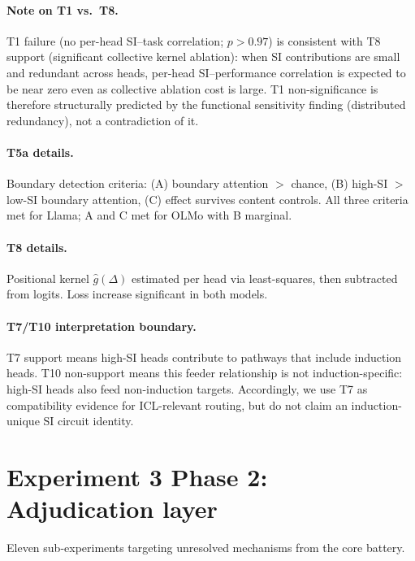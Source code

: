 \documentclass{article}
\begin{document}
\paragraph{Note on T1 vs.\ T8.}
T1 failure (no per-head SI--task correlation; $p > 0.97$) is consistent with T8 support
(significant collective kernel ablation): when SI contributions are small and redundant
across heads, per-head SI--performance correlation is expected to be near zero even as
collective ablation cost is large.
T1 non-significance is therefore structurally predicted by the functional sensitivity finding (distributed
redundancy), not a contradiction of it.

\paragraph{T5a details.} Boundary detection criteria: (A) boundary attention $>$ chance,
(B) high-SI $>$ low-SI boundary attention, (C) effect survives content controls.
All three criteria met for Llama; A and C met for OLMo with B marginal.

\paragraph{T8 details.} Positional kernel $\hat{g}(\Delta)$ estimated per head via
least-squares, then subtracted from logits. Loss increase significant in both models.

\paragraph{T7/T10 interpretation boundary.}
T7 support means high-SI heads contribute to pathways that include induction heads.
T10 non-support means this feeder relationship is not induction-specific: high-SI heads
also feed non-induction targets. Accordingly, we use T7 as compatibility evidence for
ICL-relevant routing, but do not claim an induction-unique SI circuit identity.

\section{Experiment 3 Phase 2: Adjudication layer}
\label{app:exp3p2}

Eleven sub-experiments targeting unresolved mechanisms from the core battery.
\end{document}
